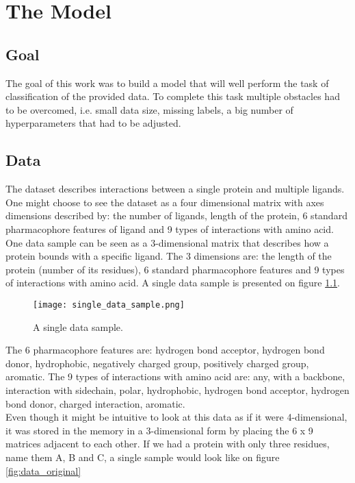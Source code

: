 \documentclass[a4paper,10pt]{report}
\begin{document}
	
  \chapter{The Model}
      
      \section{Goal}
      The goal of this work was to build a model that will well perform the task of classification of the provided data. To complete this task multiple obstacles had to be overcomed, i.e. small data size, missing labels, a big number of hyperparameters that had to be adjusted.\\
     
	 
      
      \section{Data}
	The dataset describes interactions between a single protein and multiple ligands. One might choose to see the dataset as a four dimensional matrix with axes dimensions described by: the number of ligands, length of the protein, 6 standard pharmacophore features of ligand and 9 types of interactions with amino acid\cite{2DSIFT}. One data sample can be seen as a 3-dimensional matrix that describes how a protein bounds with a specific ligand. The 3 dimensions are: the length of the protein (number of its residues), 6 standard pharmacophore features and 9 types of interactions with amino acid. A single data sample is presented on figure \ref{fig:single_data_sample2}.\\
	
	\begin{figure}[h!]
	  \centering
	  \texttt{[image: single\_data\_sample.png]}
	  \caption{A single data sample.}
	  \label{fig:single_data_sample2}
	\end{figure} 
	
	The 6 pharmacophore features are: hydrogen bond acceptor, hydrogen bond donor, hydrophobic, negatively charged group, positively charged group, aromatic. The 9 types of interactions with amino acid are: any, with a backbone, interaction with sidechain, polar, hydrophobic, hydrogen bond acceptor, hydrogen bond donor, charged interaction, aromatic.\\
	
	Even though it might be intuitive to look at this data as if it were 4-dimensional, it was stored in the memory in a 3-dimensional form by placing the 6 x 9 matrices adjacent to each other. If we had a protein with only three residues, name them A, B and C, a single sample would look like on figure \ref{fig:data_original}\\
	
\end{document}
